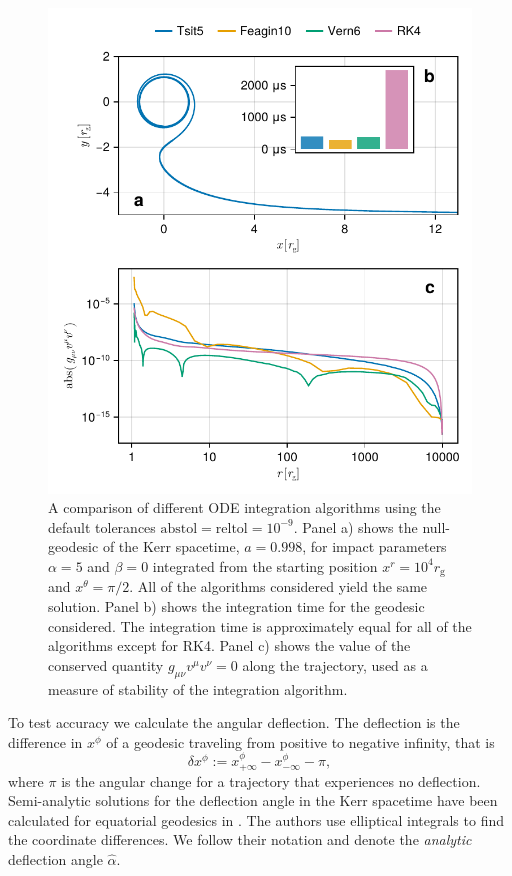 \documentclass[fleqn,usenatbib]{mnras}
\newcommand{\rg}{r_\text{g}}
\begin{document}
\begin{figure}
    \centering
    \includegraphics[width=0.95\linewidth]{figures/stability.conservation.pdf}
    \caption{A comparison of different ODE integration algorithms using the default
    tolerances $\text{abstol} = \text{reltol} = 10^{-9}$. Panel a) shows the
    null-geodesic of the Kerr spacetime, $a = 0.998$, for impact parameters
    $\alpha = 5$ and $\beta = 0$ integrated from the starting position $x^r =
    10^4 \rg$ and $x^\theta = \pi / 2$. All of the algorithms considered
    yield the same solution. Panel b) shows the integration time for the
    geodesic considered. The integration time is approximately equal for all of
    the algorithms except for RK4. Panel c) shows the value of the conserved
    quantity $g_{\mu \nu} v^\mu v^\nu = 0$ along the trajectory, used as a
    measure of stability of the integration algorithm.
}
    \label{fig:dot-stability}
\end{figure}

To test accuracy we calculate the angular deflection. The deflection is
the difference in $x^\phi$ of a geodesic traveling from positive to negative
infinity, that is
\begin{equation}
    \delta x^\phi :=
        x^\phi_{+\infty} - x^\phi_{-\infty}
        - \pi,
\end{equation}
where $\pi$ is the angular change for a trajectory that experiences no
deflection. Semi-analytic solutions for the deflection angle in the Kerr
spacetime have been calculated for equatorial geodesics in
\cite{iyer_lights_2009}. The authors use elliptical integrals to find the
coordinate differences. We follow their notation and denote the \emph{analytic}
deflection angle $\hat{\alpha}$.
\end{document}
